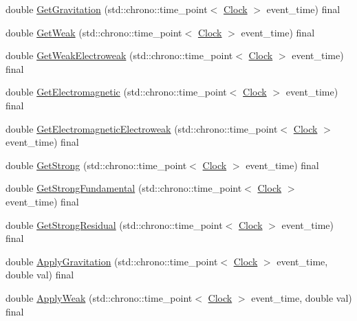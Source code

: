 \begin{DoxyCompactItemize}
\item 
double \mbox{\hyperlink{classSolid_ab5ecb5598be93fe3cd2a21c0cfd363c8}{Get\+Gravitation}} (std\+::chrono\+::time\+\_\+point$<$ \mbox{\hyperlink{universe_8h_a0ef8d951d1ca5ab3cfaf7ab4c7a6fd80}{Clock}} $>$ event\+\_\+time) final
\item 
double \mbox{\hyperlink{classSolid_ac8a7738735a6bda4e89414a2b0c370e1}{Get\+Weak}} (std\+::chrono\+::time\+\_\+point$<$ \mbox{\hyperlink{universe_8h_a0ef8d951d1ca5ab3cfaf7ab4c7a6fd80}{Clock}} $>$ event\+\_\+time) final
\item 
double \mbox{\hyperlink{classSolid_ac98f9c827d58a631627423e25dd611ba}{Get\+Weak\+Electroweak}} (std\+::chrono\+::time\+\_\+point$<$ \mbox{\hyperlink{universe_8h_a0ef8d951d1ca5ab3cfaf7ab4c7a6fd80}{Clock}} $>$ event\+\_\+time) final
\item 
double \mbox{\hyperlink{classSolid_a01cd3c441a4e339927c43536de6d9b5e}{Get\+Electromagnetic}} (std\+::chrono\+::time\+\_\+point$<$ \mbox{\hyperlink{universe_8h_a0ef8d951d1ca5ab3cfaf7ab4c7a6fd80}{Clock}} $>$ event\+\_\+time) final
\item 
double \mbox{\hyperlink{classSolid_aff7ec13bcc584d8330e3f3a1b371bbe6}{Get\+Electromagnetic\+Electroweak}} (std\+::chrono\+::time\+\_\+point$<$ \mbox{\hyperlink{universe_8h_a0ef8d951d1ca5ab3cfaf7ab4c7a6fd80}{Clock}} $>$ event\+\_\+time) final
\item 
double \mbox{\hyperlink{classSolid_ae39d0166456b8feaa39547e5a21c9096}{Get\+Strong}} (std\+::chrono\+::time\+\_\+point$<$ \mbox{\hyperlink{universe_8h_a0ef8d951d1ca5ab3cfaf7ab4c7a6fd80}{Clock}} $>$ event\+\_\+time) final
\item 
double \mbox{\hyperlink{classSolid_ab3a972354b25ad1bbe8c3f3e7638e24c}{Get\+Strong\+Fundamental}} (std\+::chrono\+::time\+\_\+point$<$ \mbox{\hyperlink{universe_8h_a0ef8d951d1ca5ab3cfaf7ab4c7a6fd80}{Clock}} $>$ event\+\_\+time) final
\item 
double \mbox{\hyperlink{classSolid_a9cfde1c3a4b7c6d2a5a3719d74e27237}{Get\+Strong\+Residual}} (std\+::chrono\+::time\+\_\+point$<$ \mbox{\hyperlink{universe_8h_a0ef8d951d1ca5ab3cfaf7ab4c7a6fd80}{Clock}} $>$ event\+\_\+time) final
\item 
double \mbox{\hyperlink{classSolid_af2b3133138ce2482faa462d07aa23042}{Apply\+Gravitation}} (std\+::chrono\+::time\+\_\+point$<$ \mbox{\hyperlink{universe_8h_a0ef8d951d1ca5ab3cfaf7ab4c7a6fd80}{Clock}} $>$ event\+\_\+time, double val) final
\item 
double \mbox{\hyperlink{classSolid_a49e35bf258104b7bce225dc21058affb}{Apply\+Weak}} (std\+::chrono\+::time\+\_\+point$<$ \mbox{\hyperlink{universe_8h_a0ef8d951d1ca5ab3cfaf7ab4c7a6fd80}{Clock}} $>$ event\+\_\+time, double val) final

\end{DoxyCompactItemize}
